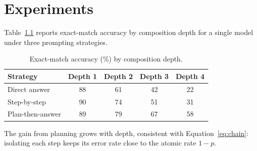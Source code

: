 \chapter{Experiments}
\label{ch:experiments}

Table~\ref{tab:depth} reports exact-match accuracy by composition depth for a single model under
three prompting strategies.

\begin{table}[htbp]
  \centering
  \caption{Exact-match accuracy (\%) by composition depth.}
  \label{tab:depth}
  \begin{tabular}{lcccc}
    \toprule
    Strategy & Depth 1 & Depth 2 & Depth 3 & Depth 4 \\
    \midrule
    Direct answer          & 88 & 61 & 42 & 22 \\
    Step-by-step           & 90 & 74 & 51 & 31 \\
    Plan-then-answer       & 89 & 79 & 67 & 58 \\
    \bottomrule
  \end{tabular}
\end{table}

The gain from planning grows with depth, consistent with Equation~\eqref{eq:chain}: isolating
each step keeps its error rate close to the atomic rate $1 - p$.
